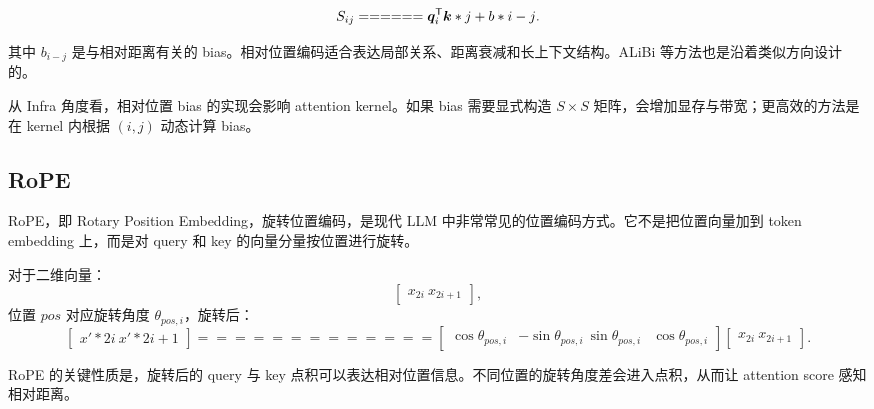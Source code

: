 \[
S_{ij}
======

\vect{q}_i^{\mathsf{T}}\vect{k}*j
+
b*{i-j}.
\]

其中 $b_{i-j}$ 是与相对距离有关的 bias。相对位置编码适合表达局部关系、距离衰减和长上下文结构。ALiBi 等方法也是沿着类似方向设计的。

从 Infra 角度看，相对位置 bias 的实现会影响 attention kernel。如果 bias 需要显式构造 $S\times S$ 矩阵，会增加显存与带宽；更高效的方法是在 kernel 内根据 $(i,j)$ 动态计算 bias。

\subsection{RoPE}
\label{subsec:rope}

RoPE，即 Rotary Position Embedding，旋转位置编码，是现代 LLM 中非常常见的位置编码方式。它不是把位置向量加到 token embedding 上，而是对 query 和 key 的向量分量按位置进行旋转。

对于二维向量：
\[
\begin{bmatrix}
x_{2i}\
x_{2i+1}
\end{bmatrix},
\]
位置 $pos$ 对应旋转角度 $\theta_{pos,i}$，旋转后：
\[
\begin{bmatrix}
x'*{2i}\
x'*{2i+1}
\end{bmatrix}
=============

\begin{bmatrix}
\cos\theta_{pos,i} & -\sin\theta_{pos,i}\
\sin\theta_{pos,i} & \cos\theta_{pos,i}
\end{bmatrix}
\begin{bmatrix}
x_{2i}\
x_{2i+1}
\end{bmatrix}.
\]

RoPE 的关键性质是，旋转后的 query 与 key 点积可以表达相对位置信息。不同位置的旋转角度差会进入点积，从而让 attention score 感知相对距离。

